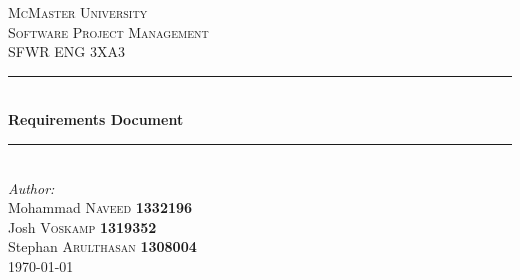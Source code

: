 \begin{titlepage}

\newcommand{\HRule}{\rule{\linewidth}{0.5mm}} %

\center %
 

\textsc{\LARGE McMaster University}\\[1.5cm] %
\textsc{\Large Software Project Management}\\[0.5cm] %
\textsc{\large SFWR ENG 3XA3}\\[0.5cm] %


\HRule \\[0.4cm]
{ \huge \bfseries Requirements Document}\\[0.4cm] %
\HRule \\[1.5cm]
 



\Large \emph{Author:}\\
Mohammad \textsc{Naveed} \textbf{1332196} \\ %
Josh \textsc{Voskamp} \textbf{1319352} \\
Stephan \textsc{Arulthasan} \textbf{1308004} \\[3cm]

{\large \today}\\[3cm] %


 

\vfill %

\end{titlepage}

